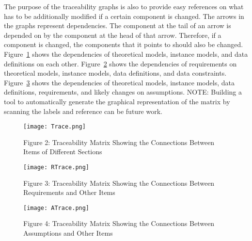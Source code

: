 \documentclass[12pt]{article}
\begin{document}
The purpose of the traceability graphs is also to provide easy references on what has to be additionally modified if a certain component is changed. The arrows in the graphs represent dependencies. The component at the tail of an arrow is depended on by the component at the head of that arrow. Therefore, if a component is changed, the components that it points to should also be changed. Figure~\ref{Figure:Figu2:TracMatrShowtheConnBetwItemofDiffSect} shows the dependencies of theoretical models, instance models, and data definitions on each other. Figure~\ref{Figure:Figu3:TracMatrShowtheConnBetwRequandOtheItem} shows the dependencies of requirements on theoretical models, instance models, data definitions, and data constraints. Figure~\ref{Figure:Figu4:TracMatrShowtheConnBetwAssuandOtheItem} shows the dependencies of theoretical models, instance models, data definitions, requirements, and likely changes on assumptions.
NOTE: Building a tool to automatically generate the graphical representation of the matrix by scanning the labels and reference can be future work.
\begin{figure}
\begin{center}
\texttt{[image: Trace.png]}
\caption{Figure 2: Traceability Matrix Showing the Connections Between Items of Different Sections}
\label{Figure:Figu2:TracMatrShowtheConnBetwItemofDiffSect}
\end{center}
\end{figure}
\begin{figure}
\begin{center}
\texttt{[image: RTrace.png]}
\caption{Figure 3: Traceability Matrix Showing the Connections Between Requirements and Other Items}
\label{Figure:Figu3:TracMatrShowtheConnBetwRequandOtheItem}
\end{center}
\end{figure}
\begin{figure}
\begin{center}
\texttt{[image: ATrace.png]}
\caption{Figure 4: Traceability Matrix Showing the Connections Between Assumptions and Other Items}
\label{Figure:Figu4:TracMatrShowtheConnBetwAssuandOtheItem}
\end{center}
\end{figure}
\end{document}

